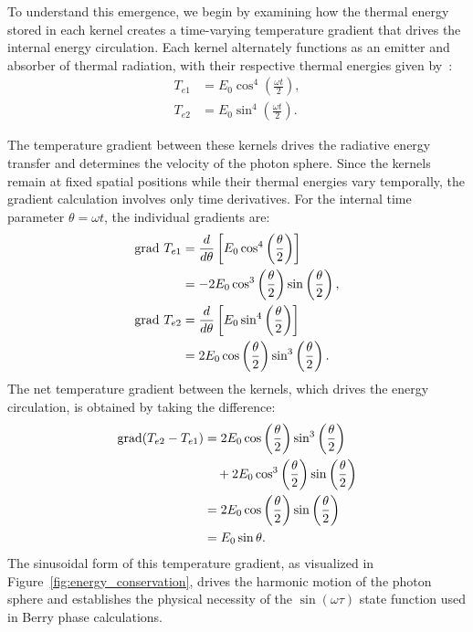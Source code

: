 \documentclass[%
 reprint,
 amsmath,amssymb,
 aps,
]{revtex4-1}
\numberwithin{equation}{section}%
\begin{document}
To understand this emergence, we begin by examining how the thermal energy stored in each kernel creates a time-varying temperature gradient that drives the internal energy circulation. Each kernel alternately functions as an emitter and absorber of thermal radiation, with their respective thermal energies given by~\cite{hanamura1811.0312}:
\begin{align}
T_{e1} &= E_0 \cos^4\left(\frac{\omega t}{2}\right), \label{eq:kernel_A_energy}\\
T_{e2} &= E_0 \sin^4\left(\frac{\omega t}{2}\right). \label{eq:kernel_B_energy}
\end{align}

The temperature gradient between these kernels drives the radiative energy transfer and determines the velocity of the photon sphere. Since the kernels remain at fixed spatial positions while their thermal energies vary temporally, the gradient calculation involves only time derivatives. For the internal time parameter $\theta = \omega t$, the individual gradients are:
\begin{align}
\mathrm{grad} \ T_{e1} &= \frac{d}{d\theta}\left[E_0 \cos^4\left(\frac{\theta}{2}\right)\right] \notag \\
&= -2E_0 \cos^3\left(\frac{\theta}{2}\right) \sin\left(\frac{\theta}{2}\right), \label{eq:grad_Te1}\\
\mathrm{grad} \ T_{e2} &= \frac{d}{d\theta}\left[E_0 \sin^4\left(\frac{\theta}{2}\right)\right] \notag \\
&= 2E_0 \cos\left(\frac{\theta}{2}\right) \sin^3\left(\frac{\theta}{2}\right). \label{eq:grad_Te2}
\end{align}
The net temperature gradient between the kernels, which drives the energy circulation, is obtained by taking the difference:
\begin{align}
\mathrm{grad}(T_{e2} - T_{e1}) &= 2E_0 \cos\left(\frac{\theta}{2}\right) \sin^3\left(\frac{\theta}{2}\right) \notag \\
& \quad + 2E_0 \cos^3\left(\frac{\theta}{2}\right) \sin\left(\frac{\theta}{2}\right) \notag \\
&= 2E_0 \cos\left(\frac{\theta}{2}\right) \sin\left(\frac{\theta}{2}\right) \notag \\
&= E_0 \sin\theta. \label{eq:temperature_gradient}
\end{align}
The sinusoidal form of this temperature gradient, as visualized in Figure~\ref{fig:energy_conservation}, drives the harmonic motion of the photon sphere and establishes the physical necessity of the $\sin(\omega\tau)$ state function used in Berry phase calculations.
\end{document}
